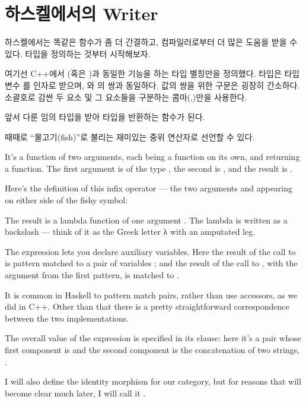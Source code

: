 \section{하스켈에서의 Writer}

하스켈에서는 똑같은 함수가 좀 더 간결하고, 컴파일러로부터 더 많은 도움을 받을 수 있다.  타입을 정의하는 것부터 시작해보자.

여기선 C++에서 (혹은 )과 동일한 기능을 하는 타입 별칭만을 정의했다.
 타입은 타입변수 를 인자로 받으며, 와 의 쌍과 동일하다.
값의 쌍을 위한 구문은 굉장히 간소하다. 소괄호로 감싼 두 요소 및 그 요소들을 구분하는 콤마(,)만을 사용한다.

앞서 다룬  임의 타입을 받아  타입을 반환하는 함수가 된다.

 때때로 ``물고기(fish)''로 불리는 재미있는 중위 연산자로 선언할 수 있다.

It's a function of two arguments, each being a function on its own, and
returning a function. The first argument is of the type
, the second is
, and the result is
.

Here's the definition of this infix operator --- the two arguments
 and  appearing on either side of the fishy
symbol:

The result is a lambda function of one argument . The lambda
is written as a backslash --- think of it as the Greek letter λ with an
amputated leg.

The  expression lets you declare auxiliary variables. Here
the result of the call to  is pattern matched to a pair of
variables ; and the result of the call to ,
with the argument  from the first pattern, is matched to
.

It is common in Haskell to pattern match pairs, rather than use
accessors, as we did in C++. Other than that there is a pretty
straightforward correspondence between the two implementations.

The overall value of the  expression is specified in its
 clause: here it's a pair whose first component is 
and the second component is the concatenation of two strings,
.

I will also define the identity morphism for our category, but for
reasons that will become clear much later, I will call it
.


